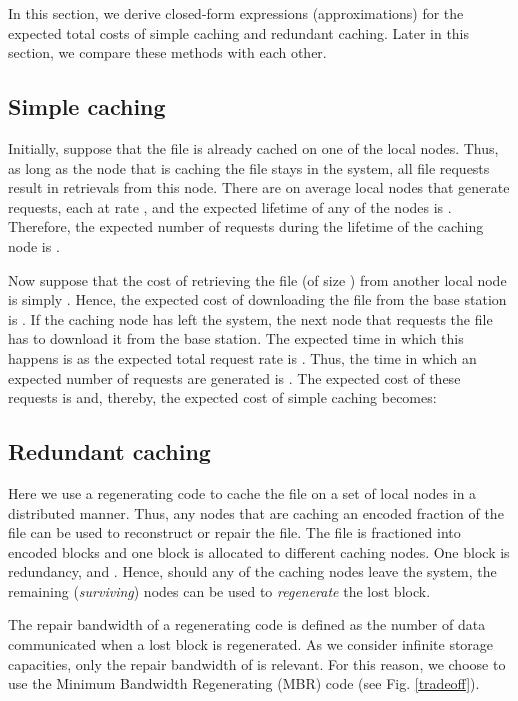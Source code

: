 \documentclass[10pt,conference]{IEEEtran}
\begin{document}
In this section, we derive closed-form expressions (approximations)
for the expected total costs of simple caching and redundant caching.
Later in this section, we compare these methods with each other.

\subsection{Simple caching}

Initially, suppose that the file is already cached on one of the local
nodes. Thus, as long as the node that is caching the file stays in the
system, all file requests result in retrievals from this node. There
are on average  local nodes that generate requests, each at rate
, and the expected lifetime of any of the nodes is .
Therefore, the expected number of requests during the lifetime of the
caching node is .

Now suppose that the cost of retrieving the file (of size ) from
another local node is simply . Hence, the expected cost of
downloading the file from the base station is . If the caching node
has left the system, the next node that requests the file has to
download it from the base station. The expected time in which this
happens is  as the expected total request rate is
. Thus, the time in which an expected number of  requests are generated is . The expected
cost of these requests is  and, thereby, the expected
cost of simple caching becomes:


\subsection{Redundant caching}
Here we use a  regenerating code \cite{dima} to
cache the file on a set of local nodes in a distributed manner. Thus,
any  nodes that are caching an encoded fraction of the file can be
used to reconstruct or repair the file. The file is fractioned into
 encoded blocks and one block is allocated to  different
caching nodes. One block is redundancy, and . Hence,
should any of the caching nodes leave the system, the remaining
(\emph{surviving})  nodes can be used to \emph{regenerate} the lost
block.

The repair bandwidth of a regenerating code is defined as the number of data communicated
when a lost block is regenerated. As we consider infinite storage capacities, only the repair bandwidth of is relevant. For this reason, we choose to use the
Minimum Bandwidth Regenerating (MBR) code (see Fig. \ref{tradeoff}).
\end{document}
